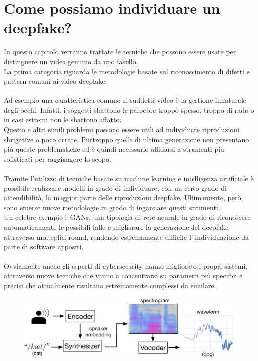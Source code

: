 \documentclass[12pt, a4paper]{article}
\begin{document}
\section{Come possiamo individuare un deepfake?}
In questo capitolo verranno trattate le tecniche che possono essere usate per distinguere un video genuino da uno fasullo.\\ La prima categoria riguarda le metodologie basate sul riconoscimento di difetti e pattern comuni ai video deepfake.\\\\
Ad esempio una caratteristica comune ai suddetti video è la gestione innaturale degli occhi. Infatti, i soggetti sbattono le palpebre troppo spesso, troppo di rado o in casi estremi non le sbattono affatto.\\
Questo e altri simili problemi possono essere utili ad individuare riproduzioni sbrigative o poco curate. Purtroppo quelle di ultima generazione non presentano più queste problematiche ed è quindi necessario affidarsi a strumenti più sofisticati per raggiungere lo scopo.\\\\
Tramite l'utilizzo di tecniche basate su machine learning e intelligenza artificiale è possibile realizzare modelli in grado di individuare, con un certo grado di attendibilità, la maggior parte delle riproduzioni deepfake. Ultimamente, però, sono emerse nuove metodologie in grado di ingannare questi strumenti.\\
Un celebre esempio è GANs, una tipologia di rete neurale in grado di riconoscere automaticamente le possibili falle e migliorare la generazione del deepfake attraverso molteplici round, rendendo estremamente difficile l' individuazione da parte di software appositi.\\\\
Ovviamente anche gli esperti di cybersecurity hanno migliorato i propri sistemi, attraverso nuove tecniche che vanno a concentrarsi su parametri più specifici e precisi che attualmente risultano estremamente complessi da emulare.\\
\begin{figure}
\includegraphics[width=1\linewidth]{img/waveform.png}
\caption{}
\label{fig2:wrapfig}
\end{figure}
\end{document}
